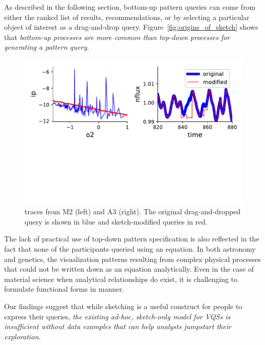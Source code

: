 As described in the following section,
bottom-up pattern queries can come from either
the ranked list of results,
recommendations, or by selecting a
particular object of interest as a drag-and-drop query.
Figure~\ref{fig:origins_of_sketch} shows that
\emph{bottom-up processes are more common
than top-down processes for generating a pattern query}.
\begin{figure}[h!]
    \centering
    \includegraphics[width=\columnwidth]{figures/QueryModificationBySketch.pdf}
    \caption{ traces from M2 (left) and A3 (right). The original drag-and-dropped query is shown in blue and sketch-modified queries in red.}%
    \label{query_modification}
    \vspace{-10pt}
\end{figure}
\par The lack of practical use of top-down pattern
specification is also reflected in the fact
that none of the participants queried using an equation.
In both astronomy and genetics, the visualization patterns
resulting from complex physical processes
that could not be written down as an equation analytically.
Even in the case of material science when analytical
relationships do exist, it is challenging to formulate  functional forms in  manner.
\par Our findings suggest that while sketching
is a useful construct for people to express their queries,
\emph{the existing ad-hoc, sketch-only model for VQSs
is insufficient without data examples
that can help analysts jumpstart their exploration}.
